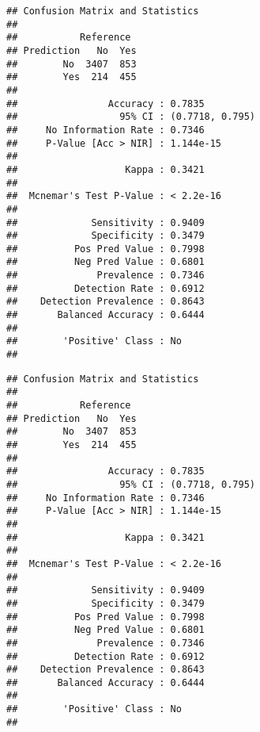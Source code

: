 \documentclass[
]{article}
\newenvironment{Shaded}{\begin{snugshade}}{\end{snugshade}}
\newcommand{\AttributeTok}[1]{\textcolor[rgb]{0.13,0.29,0.53}{#1}}
\newcommand{\FunctionTok}[1]{\textcolor[rgb]{0.13,0.29,0.53}{\textbf{#1}}}
\newcommand{\NormalTok}[1]{#1}
\newcommand{\OtherTok}[1]{\textcolor[rgb]{0.56,0.35,0.01}{#1}}
\newcommand{\SpecialCharTok}[1]{\textcolor[rgb]{0.81,0.36,0.00}{\textbf{#1}}}
\newcommand{\StringTok}[1]{\textcolor[rgb]{0.31,0.60,0.02}{#1}}
\begin{document}
\begin{verbatim}
## Confusion Matrix and Statistics
## 
##           Reference
## Prediction   No  Yes
##        No  3407  853
##        Yes  214  455
##                                          
##                Accuracy : 0.7835         
##                  95% CI : (0.7718, 0.795)
##     No Information Rate : 0.7346         
##     P-Value [Acc > NIR] : 1.144e-15      
##                                          
##                   Kappa : 0.3421         
##                                          
##  Mcnemar's Test P-Value : < 2.2e-16      
##                                          
##             Sensitivity : 0.9409         
##             Specificity : 0.3479         
##          Pos Pred Value : 0.7998         
##          Neg Pred Value : 0.6801         
##              Prevalence : 0.7346         
##          Detection Rate : 0.6912         
##    Detection Prevalence : 0.8643         
##       Balanced Accuracy : 0.6444         
##                                          
##        'Positive' Class : No             
## 
\end{verbatim}

\begin{Shaded}
\end{Shaded}

\begin{verbatim}
## Confusion Matrix and Statistics
## 
##           Reference
## Prediction   No  Yes
##        No  3407  853
##        Yes  214  455
##                                          
##                Accuracy : 0.7835         
##                  95% CI : (0.7718, 0.795)
##     No Information Rate : 0.7346         
##     P-Value [Acc > NIR] : 1.144e-15      
##                                          
##                   Kappa : 0.3421         
##                                          
##  Mcnemar's Test P-Value : < 2.2e-16      
##                                          
##             Sensitivity : 0.9409         
##             Specificity : 0.3479         
##          Pos Pred Value : 0.7998         
##          Neg Pred Value : 0.6801         
##              Prevalence : 0.7346         
##          Detection Rate : 0.6912         
##    Detection Prevalence : 0.8643         
##       Balanced Accuracy : 0.6444         
##                                          
##        'Positive' Class : No             
## 
\end{verbatim}
\end{document}

